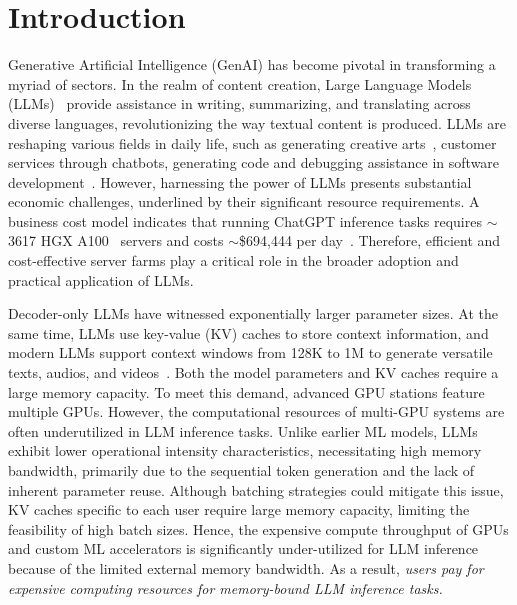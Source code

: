 \section{Introduction}

Generative Artificial Intelligence (GenAI) has become pivotal in transforming a myriad of sectors. In the realm of content creation, Large Language Models (LLMs)~\cite{openai2023gpt4, claude, gemini-pro, touvron2023llama} provide assistance in writing, summarizing, and translating across diverse languages, revolutionizing the way textual content is produced.
LLMs are reshaping various fields in daily life, such as generating creative arts~\cite{dalle3, sora}, customer services through chatbots, generating code and debugging assistance in software development~\cite{kasneci2023chatgpt}. 
However, harnessing the power of LLMs presents substantial economic challenges, underlined by their significant resource requirements. A business cost model indicates that running ChatGPT inference tasks requires $\sim$3617 HGX A100~\cite{hgxa100} servers and costs $\sim$\$694,444 per day~\cite{chatgpt-cost}. 
Therefore, efficient and cost-effective server farms play a critical role in the broader adoption and practical application of LLMs. 


Decoder-only LLMs have witnessed exponentially larger parameter sizes. 
At the same time, LLMs use key-value (KV) caches to store context information, and modern LLMs support context windows from 128K to 1M to generate versatile texts, audios, and videos~\cite{gpt4-turbo, gemini-pro}.
Both the model parameters and KV caches require a large memory capacity. To meet this demand, advanced GPU stations feature multiple GPUs. However, the computational resources of multi-GPU systems are often underutilized in LLM inference tasks. Unlike earlier ML models, LLMs exhibit lower operational intensity characteristics, necessitating high memory bandwidth, primarily due to the sequential token generation and the lack of inherent parameter reuse. Although batching strategies could mitigate this issue, KV caches specific to each user require large memory capacity, limiting the feasibility of high batch sizes.
Hence, the expensive compute throughput of GPUs and custom ML accelerators is significantly under-utilized for LLM inference because of the limited external memory bandwidth. 
As a result, \emph{users pay for expensive computing resources for memory-bound LLM inference tasks.}

